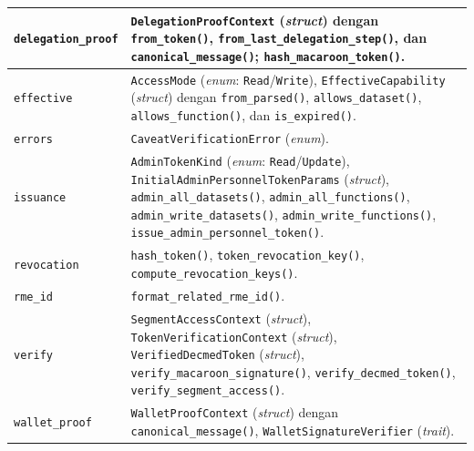 \begin{longtable}{|>{\raggedright\arraybackslash}p{}|>{\raggedright\arraybackslash}p{}|}
	\texttt{delegation\_\newline proof}
	               & \texttt{DelegationProofContext} (\textit{struct}) dengan
	\texttt{from\_token()}, \texttt{from\_last\_delegation\_step()},
	dan \texttt{canonical\_message()}; \texttt{hash\_macaroon\_token()}.
	\\ \hline

	\texttt{effective}
	               & \texttt{AccessMode} (\textit{enum}: \texttt{Read}/\texttt{Write}), \texttt{EffectiveCapability} (\textit{struct}) dengan \texttt{from\_parsed()}, \texttt{allows\_dataset()}, \texttt{allows\_function()}, dan \texttt{is\_expired()}.
	\\ \hline

	\texttt{errors}
	               & \texttt{CaveatVerificationError} (\textit{enum}).
	\\ \hline

	\texttt{issuance}
	               & \texttt{AdminTokenKind} (\textit{enum}: \texttt{Read}/\texttt{Update}), \texttt{InitialAdminPersonnelTokenParams} (\textit{struct}), \texttt{admin\_all\_datasets()}, \texttt{admin\_all\_functions()}, \texttt{admin\_write\_datasets()}, \texttt{admin\_write\_functions()}, \texttt{issue\_admin\_personnel\_token()}.
	\\ \hline

	\texttt{revocation}
	               & \texttt{hash\_token()}, \texttt{token\_revocation\_key()}, \texttt{compute\_revocation\_keys()}.
	\\ \hline

	\texttt{rme\_id}
	               & \texttt{format\_related\_rme\_id()}.
	\\ \hline

	\texttt{verify}
	               & \texttt{SegmentAccessContext} (\textit{struct}), \texttt{TokenVerificationContext} (\textit{struct}), \texttt{VerifiedDecmedToken} (\textit{struct}), \texttt{verify\_macaroon\_signature()}, \texttt{verify\_decmed\_token()}, \texttt{verify\_segment\_access()}.
	\\ \hline

	\texttt{wallet\_proof}
	               & \texttt{WalletProofContext} (\textit{struct}) dengan \texttt{canonical\_message()}, \texttt{WalletSignatureVerifier} (\textit{trait}).
	\\ \hline
\end{longtable}
\endgroup
